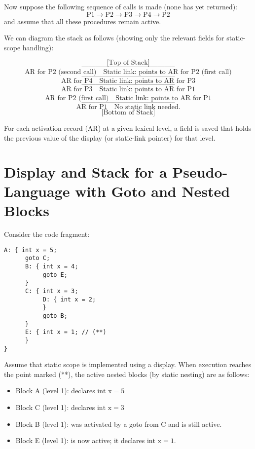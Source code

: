 \documentclass{article}
\begin{document}
Now suppose the following sequence of calls is made (none has yet returned):
\[
\text{P1} \rightarrow \text{P2} \rightarrow \text{P3} \rightarrow \text{P4} \rightarrow \text{P2}
\]
and assume that all these procedures remain active.

We can diagram the stack as follows (showing only the relevant fields for static-scope handling):

\[
\text{[Top of Stack]}
\]
\[
\text{-----------------------------------------}
\]
\[
\text{AR for P2 (second call)}  \quad \text{Static link: points to AR for P2 (first call)}
\]
\[
\text{-----------------------------------------}
\]
\[
\text{AR for P4}  \quad \text{Static link: points to AR for P3}
\]
\[
\text{-----------------------------------------}
\]
\[
\text{AR for P3}  \quad \text{Static link: points to AR for P1}
\]
\[
\text{-----------------------------------------}
\]
\[
\text{AR for P2 (first call)}  \quad \text{Static link: points to AR for P1}
\]
\[
\text{-----------------------------------------}
\]
\[
\text{AR for P1}  \quad \text{No static link needed.}
\]
\[
\text{[Bottom of Stack]}
\]

For each activation record (AR) at a given lexical level, a field is saved that holds the previous value of the display (or static-link pointer) for that level.

\section{Display and Stack for a Pseudo-Language with Goto and Nested Blocks}
Consider the code fragment:

\begin{verbatim}
A: { int x = 5;
      goto C;
      B: { int x = 4;
           goto E;
      }
      C: { int x = 3;
           D: { int x = 2;
           }
           goto B;
      }
      E: { int x = 1; // (**)
      }
}
\end{verbatim}

Assume that static scope is implemented using a display. When execution reaches the point marked (**), the active nested blocks (by static nesting) are as follows:

\begin{itemize}
    \item Block A (level 1): declares \( \text{int x} = 5 \)
    \item Block C (level 1): declares \( \text{int x} = 3 \)
    \item Block B (level 1): was activated by a goto from C and is still active.
    \item Block E (level 1): is now active; it declares \( \text{int x} = 1 \).
\end{itemize}
\end{document}

